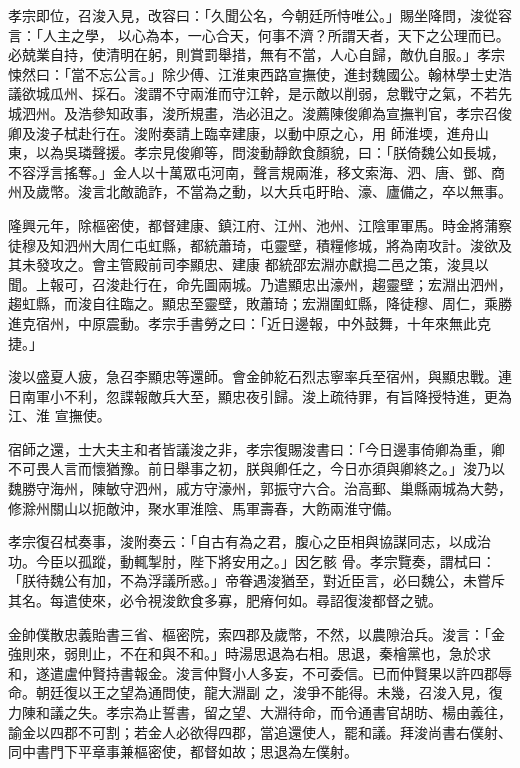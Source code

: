 \begin{pinyinscope}
 孝宗即位，召浚入見，改容曰：「久聞公名，今朝廷所恃唯公。」賜坐降問，浚從容言：「人主之學，
 以心為本，一心合天，何事不濟？所謂天者，天下之公理而已。必兢業自持，使清明在躬，則賞罰舉措，無有不當，人心自歸，敵仇自服。」孝宗悚然曰：「當不忘公言。」除少傅、江淮東西路宣撫使，進封魏國公。翰林學士史浩議欲城瓜州、採石。浚謂不守兩淮而守江幹，是示敵以削弱，怠戰守之氣，不若先城泗州。及浩參知政事，浚所規畫，浩必沮之。浚薦陳俊卿為宣撫判官，孝宗召俊卿及浚子栻赴行在。浚附奏請上臨幸建康，以動中原之心，用
 師淮堧，進舟山東，以為吳璘聲援。孝宗見俊卿等，問浚動靜飲食顏貌，曰：「朕倚魏公如長城，不容浮言搖奪。」金人以十萬眾屯河南，聲言規兩淮，移文索海、泗、唐、鄧、商州及歲幣。浚言北敵詭詐，不當為之動，以大兵屯盱眙、濠、廬備之，卒以無事。



 隆興元年，除樞密使，都督建康、鎮江府、江州、池州、江陰軍軍馬。時金將蒲察徒穆及知泗州大周仁屯虹縣，都統蕭琦，屯靈壁，積糧修城，將為南攻計。浚欲及其未發攻之。會主管殿前司李顯忠、建康
 都統邵宏淵亦獻搗二邑之策，浚具以聞。上報可，召浚赴行在，命先圖兩城。乃遣顯忠出濠州，趨靈壁；宏淵出泗州，趨虹縣，而浚自往臨之。顯忠至靈壁，敗蕭琦；宏淵圍虹縣，降徒穆、周仁，乘勝進克宿州，中原震動。孝宗手書勞之曰：「近日邊報，中外鼓舞，十年來無此克捷。」



 浚以盛夏人疲，急召李顯忠等還師。會金帥紇石烈志寧率兵至宿州，與顯忠戰。連日南軍小不利，忽諜報敵兵大至，顯忠夜引歸。浚上疏待罪，有旨降授特進，更為江、淮
 宣撫使。



 宿師之還，士大夫主和者皆議浚之非，孝宗復賜浚書曰：「今日邊事倚卿為重，卿不可畏人言而懷猶豫。前日舉事之初，朕與卿任之，今日亦須與卿終之。」浚乃以魏勝守海州，陳敏守泗州，戚方守濠州，郭振守六合。治高郵、巢縣兩城為大勢，修滁州關山以扼敵沖，聚水軍淮陰、馬軍壽春，大飭兩淮守備。



 孝宗復召栻奏事，浚附奏云：「自古有為之君，腹心之臣相與協謀同志，以成治功。今臣以孤蹤，動輒掣肘，陛下將安用之。」因乞骸
 骨。孝宗覽奏，謂栻曰：「朕待魏公有加，不為浮議所惑。」帝眷遇浚猶至，對近臣言，必曰魏公，未嘗斥其名。每遣使來，必令視浚飲食多寡，肥瘠何如。尋詔復浚都督之號。



 金帥僕散忠義貽書三省、樞密院，索四郡及歲幣，不然，以農隙治兵。浚言：「金強則來，弱則止，不在和與不和。」時湯思退為右相。思退，秦檜黨也，急於求和，遂遣盧仲賢持書報金。浚言仲賢小人多妄，不可委信。已而仲賢果以許四郡辱命。朝廷復以王之望為通問使，龍大淵副
 之，浚爭不能得。未幾，召浚入見，復力陳和議之失。孝宗為止誓書，留之望、大淵待命，而令通書官胡昉、楊由義往，諭金以四郡不可割；若金人必欲得四郡，當追還使人，罷和議。拜浚尚書右僕射、同中書門下平章事兼樞密使，都督如故；思退為左僕射。




\end{pinyinscope}
